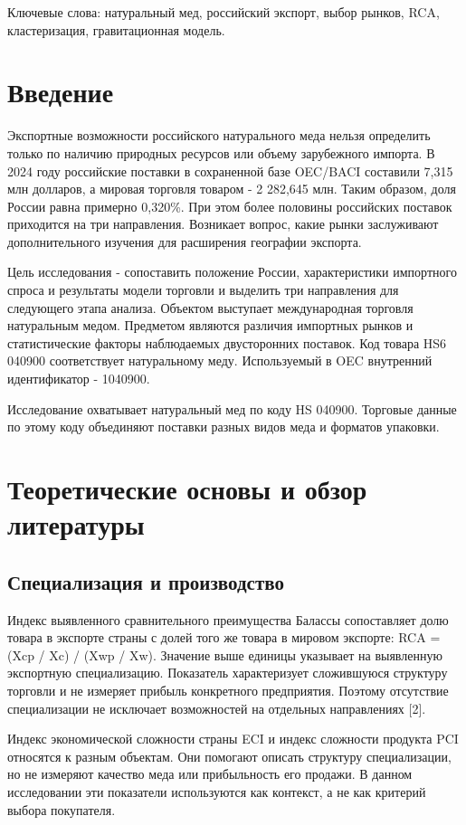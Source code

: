 \documentclass[12pt,a4paper]{article}
\begin{document}
Ключевые слова: натуральный мед, российский экспорт, выбор рынков, RCA, кластеризация, гравитационная модель.

\section{Введение}
Экспортные возможности российского натурального меда нельзя определить только по наличию природных ресурсов или объему зарубежного импорта. В 2024 году российские поставки в сохраненной базе OEC/BACI составили 7,315 млн долларов, а мировая торговля товаром - 2 282,645 млн. Таким образом, доля России равна примерно 0,320\%. При этом более половины российских поставок приходится на три направления. Возникает вопрос, какие рынки заслуживают дополнительного изучения для расширения географии экспорта.

Цель исследования - сопоставить положение России, характеристики импортного спроса и результаты модели торговли и выделить три направления для следующего этапа анализа. Объектом выступает международная торговля натуральным медом. Предметом являются различия импортных рынков и статистические факторы наблюдаемых двусторонних поставок. Код товара HS6 040900 соответствует натуральному меду. Используемый в OEC внутренний идентификатор - 1040900.

Исследование охватывает натуральный мед по коду HS 040900. Торговые данные по этому коду объединяют поставки разных видов меда и форматов упаковки.

\section{Теоретические основы и обзор литературы}
\subsection{Специализация и производство}
Индекс выявленного сравнительного преимущества Балассы сопоставляет долю товара в экспорте страны с долей того же товара в мировом экспорте: RCA = (Xcp / Xc) / (Xwp / Xw). Значение выше единицы указывает на выявленную экспортную специализацию. Показатель характеризует сложившуюся структуру торговли и не измеряет прибыль конкретного предприятия. Поэтому отсутствие специализации не исключает возможностей на отдельных направлениях [2].

Индекс экономической сложности страны ECI и индекс сложности продукта PCI относятся к разным объектам. Они помогают описать структуру специализации, но не измеряют качество меда или прибыльность его продажи. В данном исследовании эти показатели используются как контекст, а не как критерий выбора покупателя.
\end{document}

